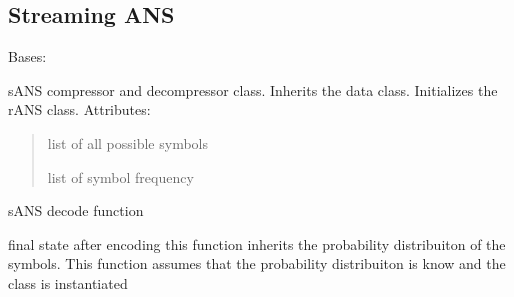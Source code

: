 \documentclass[letterpaper,10pt,english]{sphinxmanual}
\begin{document}
\sphinxstepscope


\subsection{Streaming ANS}
\label{\detokenize{sANS:module-sANS}}\label{\detokenize{sANS:streaming-ans}}\label{\detokenize{sANS::doc}}

\begin{fulllineitems}
\label{\detokenize{sANS:sANS.sANS}}
\pysigstartsignatures
{}
\pysigstopsignatures
\sphinxAtStartPar
Bases: {\hyperref[\detokenize{core:core.data.Data}]{}}

\sphinxAtStartPar
sANS compressor and decompressor class. Inherits the data class.
Initializes the rANS class. 
Attributes:
\begin{quote}
\begin{description}
\sphinxAtStartPar
list of all possible symbols

\sphinxAtStartPar
list of symbol frequency

\end{description}
\end{quote}

\begin{fulllineitems}
\label{\detokenize{sANS:sANS.sANS.decode}}
\pysigstartsignatures
{}
\pysigstopsignatures
\sphinxAtStartPar
sANS decode function
\begin{description}
\begin{description}
\sphinxAtStartPar
final state after encoding 
this function inherits the probability distribuiton of the symbols.
This function assumes that the probability distribuiton is know and the class is instantiated


\end{description}
\end{description}
\end{fulllineitems}
\end{fulllineitems}
\end{document}
